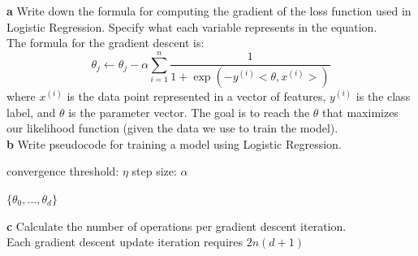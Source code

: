 \documentclass[a4paper]{article}
\begin{document}
\textbf{a} Write down the formula for computing the gradient of the loss function used in Logistic Regression. Specify what each variable represents in the equation.\\

The formula for the gradient descent is:
\[
\theta_j \leftarrow \theta_j - \alpha \sum_{i=1}^{n} \frac{1}{1 + \exp(-y^{(i)} <\theta, x^{(i)}> )}
\]
where $x^{(i)}$ is the data point represented in a vector of features, $y^{(i)}$ is the class label, and $\theta$ is the parameter vector. The goal is to reach the $\theta$ that maximizes our likelihood function (given the data we use to train the model).\\

\textbf{b} Write pseudocode for training a model using Logistic Regression.\\

\SetEndCharOfAlgoLine{}

\begin{algorithm}[H]
 convergence threshold: $\eta$\;
 step size: $\alpha$\;
 
  \Return $\{\theta_0,...,\theta_d\}$\;
\end{algorithm}\DecMargin{1em}

\textbf{c} Calculate the number of operations per gradient descent iteration.\\
Each gradient descent update iteration requires $2n(d + 1)$\\
\end{document}
